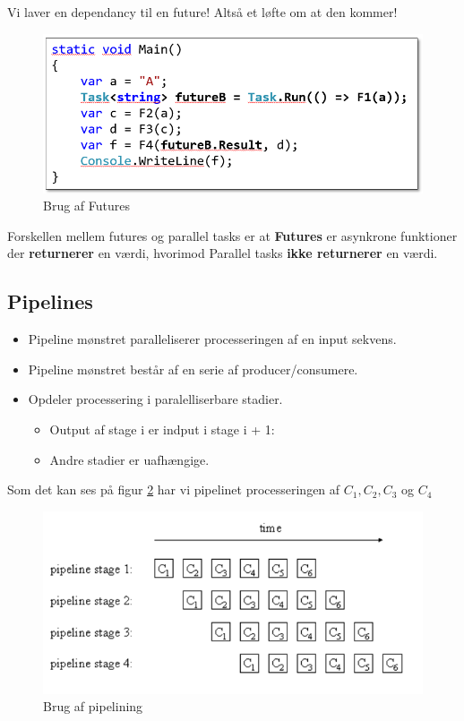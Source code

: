Vi laver en dependancy til en future! Altså et løfte om at den kommer!

\begin{figure}[H]
	\centering
	\includegraphics[width=0.6\linewidth]{figs/pipeFut/futureB}
	\caption{Brug af Futures}
	\label{fig:FutureEx}
\end{figure}

Forskellen mellem futures og parallel tasks er at \textbf{Futures} er asynkrone funktioner der \textbf{returnerer} en værdi, hvorimod Parallel tasks \textbf{ikke returnerer} en værdi.

\subsection{Pipelines}
\begin{itemize}
	\item Pipeline mønstret paralleliserer processeringen af en input sekvens.
	\item Pipeline mønstret består af en serie af producer/consumere.
	\item Opdeler processering i paralelliserbare stadier.
	\begin{itemize}
		\item Output af stage i er indput i stage i + 1:
		\item Andre stadier er uafhængige.
	\end{itemize}
\end{itemize}

Som det kan ses på figur \ref{fig:pipelining} har vi pipelinet processeringen af $C_1, C_2, C_3$ og $C_4$ 

\begin{figure}[H]
	\centering
	\includegraphics[width=0.7\linewidth]{figs/pipeFut/stagees}
	\caption{Brug af pipelining}
	\label{fig:pipelining}
\end{figure}

